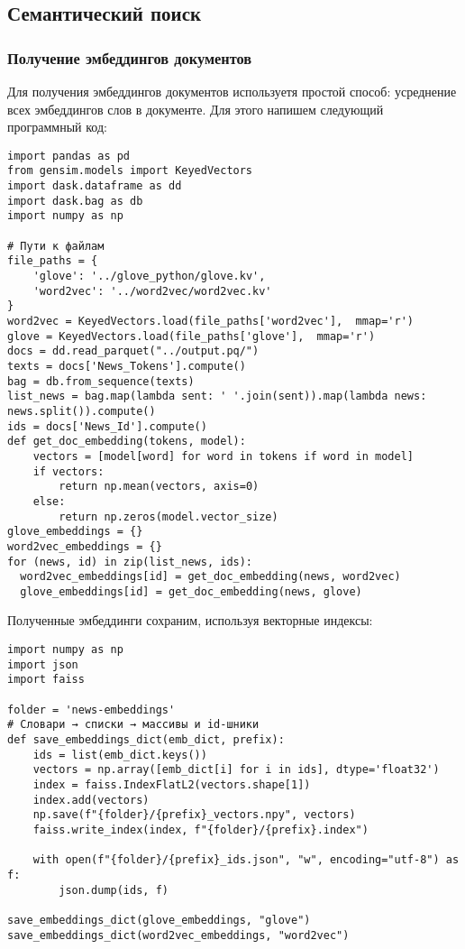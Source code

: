 \documentclass[coursework]{SCWorks}
\begin{document}
\subsection{Семантический поиск}
\subsubsection{Получение эмбеддингов документов}

Для получения эмбеддингов документов используетя простой способ: усреднение всех эмбеддингов слов в документе. Для этого напишем следующий программный код:
\begin{verbatim}
import pandas as pd
from gensim.models import KeyedVectors
import dask.dataframe as dd
import dask.bag as db
import numpy as np

# Пути к файлам
file_paths = {
    'glove': '../glove_python/glove.kv',
    'word2vec': '../word2vec/word2vec.kv'
}
word2vec = KeyedVectors.load(file_paths['word2vec'],  mmap='r')
glove = KeyedVectors.load(file_paths['glove'],  mmap='r')
docs = dd.read_parquet("../output.pq/")
texts = docs['News_Tokens'].compute()
bag = db.from_sequence(texts)
list_news = bag.map(lambda sent: ' '.join(sent)).map(lambda news: news.split()).compute()
ids = docs['News_Id'].compute()
def get_doc_embedding(tokens, model):
    vectors = [model[word] for word in tokens if word in model]
    if vectors:
        return np.mean(vectors, axis=0)
    else:
        return np.zeros(model.vector_size)
glove_embeddings = {}
word2vec_embeddings = {}
for (news, id) in zip(list_news, ids):
  word2vec_embeddings[id] = get_doc_embedding(news, word2vec)
  glove_embeddings[id] = get_doc_embedding(news, glove)
\end{verbatim}

Полученные эмбеддинги сохраним, используя векторные индексы:
\begin{verbatim}
import numpy as np
import json
import faiss

folder = 'news-embeddings'
# Словари → списки → массивы и id-шники
def save_embeddings_dict(emb_dict, prefix):
    ids = list(emb_dict.keys())
    vectors = np.array([emb_dict[i] for i in ids], dtype='float32')
    index = faiss.IndexFlatL2(vectors.shape[1])
    index.add(vectors)
    np.save(f"{folder}/{prefix}_vectors.npy", vectors)
    faiss.write_index(index, f"{folder}/{prefix}.index")

    with open(f"{folder}/{prefix}_ids.json", "w", encoding="utf-8") as f:
        json.dump(ids, f)

save_embeddings_dict(glove_embeddings, "glove")
save_embeddings_dict(word2vec_embeddings, "word2vec")
\end{verbatim}
\end{document}
